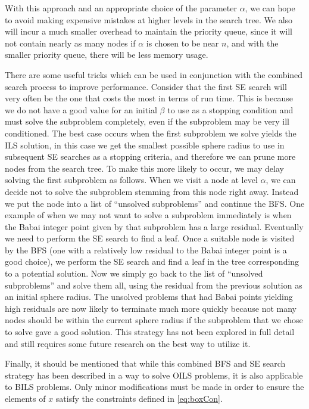 \documentclass[12pt,Bold,letterpaper]{mcgilletdclass}
\begin{document}
With this approach and an appropriate choice of the parameter $\alpha$, we can hope to avoid making expensive mistakes at higher levels in the search tree. We also will incur a much smaller overhead to maintain the priority queue, since it will not contain nearly as many nodes if $\alpha$ is chosen to be near $n$, and with the smaller priority queue, there will be less memory usage. 

There are some useful tricks which can be used in conjunction with the combined search process to improve performance. Consider that the first SE search will very often be the one that costs the most in terms of run time. This is because we do not have a good value for an initial $\beta$ to use as a stopping condition and must solve the subproblem completely, even if the subproblem may be very ill conditioned. The best case occurs when the first subproblem we solve yields the ILS solution, in this case we get the smallest possible sphere radius to use in subsequent SE searches as a stopping criteria, and therefore we can prune more nodes from the search tree. To make this more likely to occur, we may delay solving the first subproblem as follows. When we visit a node at level $\alpha$, we can decide not to solve the subproblem stemming from this node right away. Instead we put the node into a list of ``unsolved subproblems'' and continue the BFS. One example of when we may not want to solve a subproblem immediately is when the Babai integer point given by that subproblem has a large residual. Eventually we need to perform the SE search to find a leaf. Once a suitable node is visited by the BFS (one with a relatively low residual to the Babai integer point is a good choice), we perform the SE search and find a leaf in the tree corresponding to a potential solution. Now we simply go back to the list of ``unsolved subproblems'' and solve them all, using the residual from the previous solution as an initial sphere radius. The unsolved problems that had Babai points yielding high residuals are now likely to terminate much more quickly because not many nodes should be within the current sphere radius if the subproblem that we chose to solve gave a good solution. This strategy has not been explored in full detail and still requires some future research on the best way to utilize it.

Finally, it should be mentioned that while this combined BFS and SE search strategy has been described in a way to solve OILS problems, it is also applicable to BILS problems. Only minor modifications must be made in order to ensure the elements of $x$ satisfy the constraints defined in \eqref{eq:boxCon}.
\end{document}
